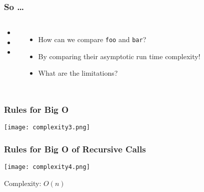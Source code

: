 \begin{frame}
	\frametitle{So \ldots}

	\begin{columns}
	\begin{itemize}
		\item 
		\item 
		\item 
	\end{itemize}	
		
	\begin{itemize}
		\item How can we compare \texttt{foo} and \texttt{bar}?
		\item By comparing their asymptotic run time complexity!
		\item What are the limitations?
	\end{itemize}	
		
	\end{columns}
\end{frame}

\begin{frame}[fragile]
	\frametitle{Rules for Big O}

	
\begin{center}
\texttt{[image: complexity3.png]}
\end{center}


\end{frame}

\begin{frame}[fragile]
	\frametitle{Rules for Big O of Recursive Calls}

	
\begin{center}
\texttt{[image: complexity4.png]}
\end{center}

Complexity: $O(n)$
\end{frame}


